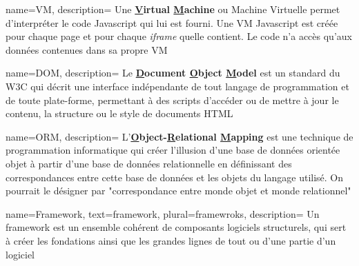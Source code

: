 {
    name=VM,
    description=
    {
        Une \textbf{\underline{V}irtual \underline{M}achine} ou Machine Virtuelle permet d'interpréter le code Javascript qui lui est fourni. Une VM Javascript est créée pour chaque page et pour chaque \textit{iframe} quelle contient. Le code n'a accès qu'aux données contenues dans sa propre VM
    }
}

{
    name=DOM,
    description=
    {
        Le \textbf{\underline{D}ocument \underline{O}bject \underline{M}odel} est un standard du W3C qui décrit une interface indépendante de tout langage de programmation et de toute plate-forme, permettant à des scripts d'accéder ou de mettre à jour le contenu, la structure ou le style de documents HTML
    }
}

{
    name=ORM,
    description=
    {
        L'\textbf{\underline{O}bject-\underline{R}elational \underline{M}apping} est une technique de programmation informatique qui créer l'illusion d'une base de données orientée objet à partir d'une base de données relationnelle en définissant des correspondances entre cette base de données et les objets du langage utilisé. On pourrait le désigner par "correspondance entre monde objet et monde relationnel"
    }
}

{
    name=Framework,
    text=framework,
    plural=framewroks,
    description=
    {
        Un framework est un ensemble cohérent de composants logiciels structurels, qui sert à créer les fondations ainsi que les grandes lignes de tout ou d’une partie d'un logiciel
    }
}